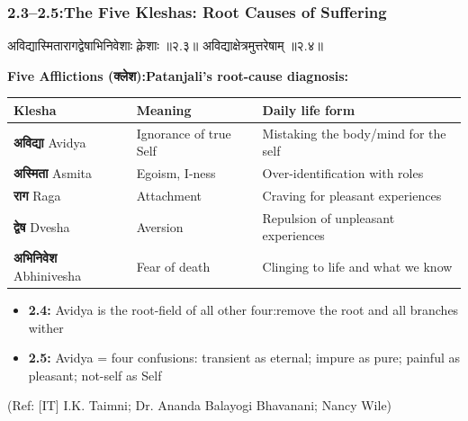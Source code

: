 \begin{frame}[fragile]\frametitle{2.3–2.5:The Five Kleshas: Root Causes of Suffering}

\begin{sanskrit}
अविद्यास्मितारागद्वेषाभिनिवेशाः क्लेशाः ॥२.३॥
अविद्याक्षेत्रमुत्तरेषाम् ॥२.४॥
\end{sanskrit}

\textbf{Five Afflictions (क्लेश):Patanjali's root-cause diagnosis:}

\begin{center}
{\small
\begin{tabular}{|p{2cm}|p{2cm}|p{3cm}|}
\hline
\textbf{Klesha} & \textbf{Meaning} & \textbf{Daily life form} \\
\hline
\textbf{अविद्या} Avidya & Ignorance of true Self & Mistaking the body/mind for the self \\
\textbf{अस्मिता} Asmita & Egoism, I-ness & Over-identification with roles \\
\textbf{राग} Raga & Attachment & Craving for pleasant experiences \\
\textbf{द्वेष} Dvesha & Aversion & Repulsion of unpleasant experiences \\
\textbf{अभिनिवेश} Abhinivesha & Fear of death & Clinging to life and what we know \\
\hline
\end{tabular}
}
\end{center}

\begin{itemize}
\item \textbf{2.4:} Avidya is the root-field of all other four:remove the root and all branches wither
\item \textbf{2.5:} Avidya = four confusions: transient as eternal; impure as pure; painful as pleasant; not-self as Self
\end{itemize}

\tiny{(Ref: [IT] I.K. Taimni; Dr. Ananda Balayogi Bhavanani; Nancy Wile)}

\end{frame}


